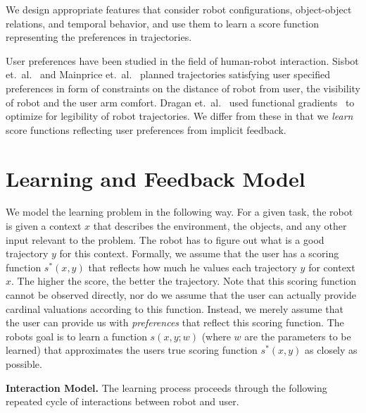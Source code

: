 We design appropriate features that consider robot configurations, object-object relations, and temporal behavior, and use them to learn a score function representing the preferences in trajectories.

User preferences have been studied in the field of human-robot interaction. Sisbot et.~al.~\citep{Sisbot07,Sisbot07b} and Mainprice et.~al.~\citep{Mainprice11} planned trajectories satisfying user specified preferences in form of constraints on the distance of robot from user, the visibility of robot and the user arm comfort. Dragan et.~al.~\citep{Dragan13b} used functional gradients~\citep{Chomp} to optimize for legibility of robot trajectories. We differ from these in that we \textit{learn} score functions reflecting user preferences from implicit feedback. 

\section{Learning and Feedback Model} \label{sec:coactmodel}

We model the learning problem in the following way. For a given task, the robot is given a context $x$ that describes the environment, the objects, and any other input relevant to the problem.  The robot has to figure out what is a good trajectory $y$ for this context. Formally, we assume that the user has a scoring function $s^*(x,y)$ that reflects how much he values each trajectory $y$ for context $x$. The higher the score, the better the trajectory. Note that this scoring function cannot be observed directly, nor do we assume that the user can actually provide cardinal valuations according to this function. Instead, we merely assume that the user can provide us with 
{\em preferences} that reflect this scoring function. The robots goal is to learn a function $s(x,y;w)$ (where $w$ are the parameters to be learned) that approximates the users true scoring function $s^*(x,y)$ as closely as possible. 

\textbf{Interaction Model.} The learning process proceeds through the following repeated cycle of interactions between robot and user. 

